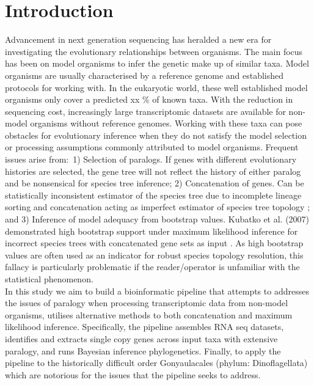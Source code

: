 \documentclass[12pt]{article}
\begin{document}
\section{Introduction}
Advancement in next generation sequencing has heralded a new era for investigating the evolutionary relationships between organisms. 
The main focus has been on model organisms to infer the genetic make up of similar taxa. 
Model organisms are usually characterised by a reference genome and established protocols for working with. 
In the eukaryotic world, these well established model organisms only cover a predicted xx \% of known taxa. 
With the reduction in sequencing cost, increasingly large transcriptomic datasets are available for non-model organisms without reference genomes. 
Working with these taxa can pose obstacles for evolutionary inference when they do not satisfy the model selection or processing assumptions commonly attributed to model organisms. Frequent issues arise from:\
1) Selection of paralogs. If genes with different evolutionary histories are selected, the gene tree will not reflect the history of either paralog and be nonsensical for species tree inference; 
2) Concatenation of genes. Can be statistically inconsistent estimator of the species tree due to incomplete lineage sorting and concatenation acting as imperfect estimator of species tree topology \cite{roch2015likelihood}; and 
3) Inference of model adequacy from bootstrap values. Kubatko et al. (2007) demonstrated high bootstrap support under maximum likelihood inference for incorrect species trees with concatenated gene sets as input \cite{kubatko2007inconsistency}. As high bootstrap values are often used as an indicator for robust species topology resolution, this fallacy is particularly problematic if the reader/operator is unfamiliar with the statistical phenomenon.\\
In this study we aim to build a bioinformatic pipeline that attempts to addresses the issues of paralogy when processing transcriptomic data from non-model organisms, utilises alternative methods to both concatenation and maximum likelihood inference. 
Specifically, the pipeline assembles RNA seq datasets, identifies and extracts single copy genes across input taxa with extensive paralogy, and runs Bayesian inference phylogenetics. 
Finally, to apply the pipeline to the historically difficult order Gonyaulacales (phylum: Dinoflagellata) which are notorious for the issues that the pipeline seeks to address.\\
\end{document}

